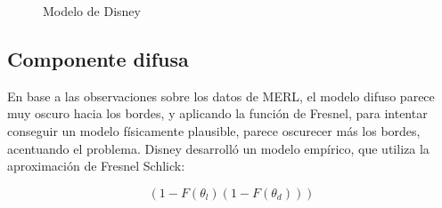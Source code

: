 \begin{figure}[H]
    \vspace{0.5cm}
    \centering
    \caption{Modelo de Disney}
\end{figure}
    
    \subsection{Componente difusa}

    En base a las observaciones sobre los datos de MERL, el modelo difuso parece muy oscuro hacia los bordes, y aplicando
    la funci\'on de Fresnel, para intentar conseguir un modelo f\'isicamente plausible, parece oscurecer m\'as los bordes,
    acentuando el problema. Disney desarroll\'o un modelo emp\'irico, que utiliza la aproximaci\'on de Fresnel Schlick:

    \begin{equation}
        (1 - F(\theta_l) (1 - F(\theta_d)))
    \end{equation}
    \singlespacing



